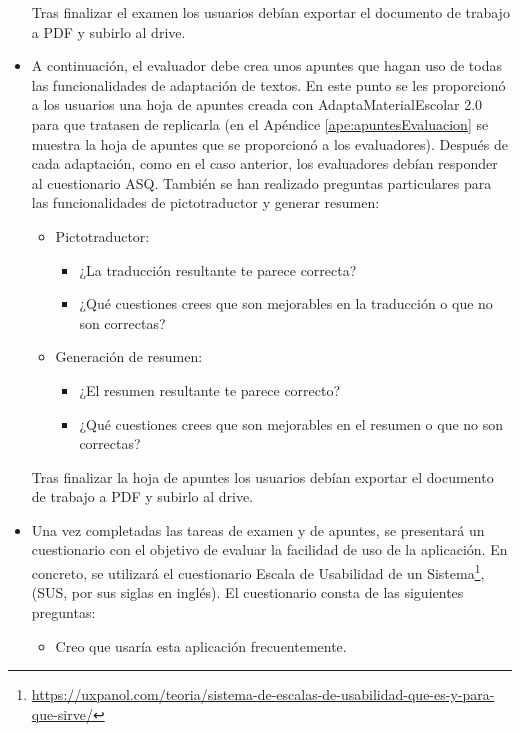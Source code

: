 \begin{itemize}
          Tras finalizar el examen los usuarios debían exportar el documento de trabajo a PDF y subirlo al drive.

    \item A continuación, el evaluador debe crea unos apuntes que hagan uso de todas las funcionalidades de adaptación de textos. En este punto se les proporcionó a los usuarios una hoja de apuntes creada con AdaptaMaterialEscolar 2.0 para que tratasen de replicarla (en el Apéndice \ref{ape:apuntesEvaluacion} se muestra la hoja de apuntes que se proporcionó a los evaluadores). Después de cada adaptación, como en el caso anterior, los evaluadores debían responder al cuestionario ASQ. También se han realizado preguntas particulares para las funcionalidades de pictotraductor y generar resumen:
          \begin{itemize}
              \item Pictotraductor:
                    \begin{itemize}
                        \item ¿La traducción resultante te parece correcta?
                        \item ¿Qué cuestiones crees que son mejorables en la traducción o que no son correctas?
                    \end{itemize}
              \item Generación de resumen:
                    \begin{itemize}
                        \item ¿El resumen resultante te parece correcto?
                        \item ¿Qué cuestiones crees que son mejorables en el resumen o que no son correctas?
                    \end{itemize}
          \end{itemize}
          Tras finalizar la hoja de apuntes los usuarios debían exportar el documento de trabajo a PDF y subirlo al drive.
    \item Una vez completadas las tareas de examen y de apuntes, se presentará un cuestionario con el objetivo de evaluar la facilidad de uso de la aplicación. En concreto, se utilizará el cuestionario Escala de Usabilidad de un Sistema\footnote{\url{https://uxpanol.com/teoria/sistema-de-escalas-de-usabilidad-que-es-y-para-que-sirve/}}, (SUS, por sus siglas en inglés). El cuestionario consta de las siguientes preguntas:
          \begin{itemize}
              \item Creo que usaría esta aplicación frecuentemente.

\end{itemize}
\end{itemize}

